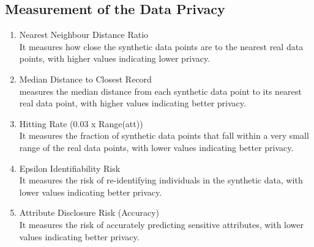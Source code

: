 \subsection{Measurement of the Data Privacy}


\begin{enumerate}
    \item Nearest Neighbour Distance Ratio \\
     It measures how close the synthetic data points are to the nearest real data points, with higher values indicating lower privacy.

    \item Median Distance to Closest Record \\
    measures the median distance from each synthetic data point to its nearest real data point, with higher values indicating better privacy.

    \item Hitting Rate (0.03 x Range(att)) \\
    It measures the fraction of synthetic data points that fall within a very small range of the real data points, with lower values indicating better privacy.

    \item Epsilon Identifiability Risk \\
    It measures the risk of re-identifying individuals in the synthetic data, with lower values indicating better privacy.

    \item Attribute Disclosure Risk (Accuracy) \\
    It measures the risk of accurately predicting sensitive attributes, with lower values indicating better privacy.
    
\end{enumerate}